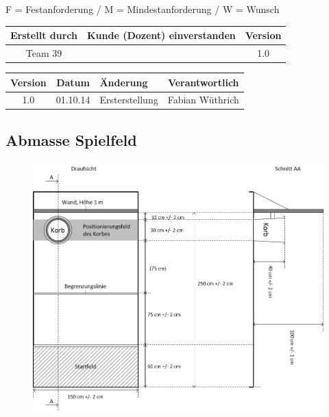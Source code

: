 
F = Festanforderung / M = Mindestanforderung / W = Wunsch

\renewcommand{\arraystretch}{1.5}


\begin{table}[!h]
	\begin{tabularx}{\columnwidth}{|c|X|c|}
		\hline Erstellt durch & Kunde (Dozent) einverstanden & Version \\ 
		\hline \parbox[0pt][3em][c]{0cm}{} Team 39 &  & 1.0 \\
		\hline 
	\end{tabularx}
\end{table}	

\begin{table}[!h]
	\begin{tabularx}{\columnwidth}{|c|c|X|c|}
		\hline Version & Datum & Änderung & Verantwortlich \\ 
		\hline 1.0 & 01.10.14 & Ersterstellung & Fabian Wüthrich \\ 
		\hline 
	\end{tabularx}
\end{table}	

\begin{appendices}
	\chapter{Abmasse Spielfeld}\label{app:spielfeld} 
	\begin{figure}[!h]
		\centering
		\includegraphics[width=0.7\linewidth]{../../fig/spielfeld}
		\label{fig:Bild1}
	\end{figure}
\end{appendices}